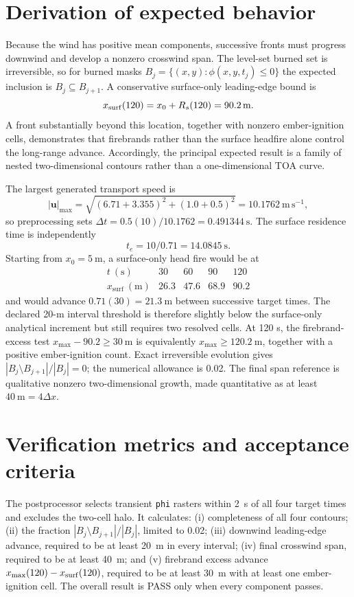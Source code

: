 \section{Derivation of expected behavior}
Because the wind has positive mean components, successive fronts must progress downwind and develop a nonzero crosswind span. The level-set burned set is irreversible, so for burned masks $B_j=\{(x,y):\phi(x,y,t_j)\le0\}$ the expected inclusion is $B_j\subseteq B_{j+1}$. A conservative surface-only leading-edge bound is
\[
x_{\rm surf}(120)=x_0+R_s(120)=\SI{90.2}{m}.
\]
A front substantially beyond this location, together with nonzero ember-ignition cells, demonstrates that firebrands rather than the surface headfire alone control the long-range advance. Accordingly, the principal expected result is a family of nested two-dimensional contours rather than a one-dimensional TOA curve.

The largest generated transport speed is
\[
 |\mathbf u|_{\max}=\sqrt{(6.71+3.355)^2+(1.0+0.5)^2}
 =10.1762~\mathrm{m\,s^{-1}},
\]
so preprocessing sets
\(\Delta t=0.5(10)/10.1762=0.491344~\mathrm{s}\).  The surface residence
time is independently
\[
 t_e=10/0.71=14.0845~\mathrm{s}.
\]
Starting from \(x_0=5~\mathrm{m}\), a surface-only head fire would be at
\[
\begin{array}{c|rrrr}
t~(\mathrm{s})&30&60&90&120\\\hline
x_{\mathrm{surf}}~(\mathrm{m})&26.3&47.6&68.9&90.2
\end{array}
\]
and would advance \(0.71(30)=21.3~\mathrm{m}\) between successive target
times.  The declared 20-m interval threshold is therefore slightly below the
surface-only analytical increment but still requires two resolved cells.
At 120 s, the firebrand-excess test
\(x_{\max}-90.2\geq30~\mathrm{m}\) is equivalently
\(x_{\max}\geq120.2~\mathrm{m}\), together with a positive ember-ignition
count.  Exact irreversible evolution gives
\(|B_j\setminus B_{j+1}|/|B_j|=0\); the numerical allowance is 0.02.
The final span reference is qualitative nonzero two-dimensional growth, made
quantitative as at least \(40~\mathrm{m}=4\Delta x\).

\section{Verification metrics and acceptance criteria}
The postprocessor selects transient \texttt{phi} rasters within \SI{2}{s} of all four target times and excludes the two-cell halo. It calculates: (i) completeness of all four contours; (ii) the fraction $|B_j\setminus B_{j+1}|/|B_j|$, limited to 0.02; (iii) downwind leading-edge advance, required to be at least \SI{20}{m} in every interval; (iv) final crosswind span, required to be at least \SI{40}{m}; and (v) firebrand excess advance $x_{\max}(120)-x_{\rm surf}(120)$, required to be at least \SI{30}{m} with at least one ember-ignition cell. The overall result is PASS only when every component passes.

